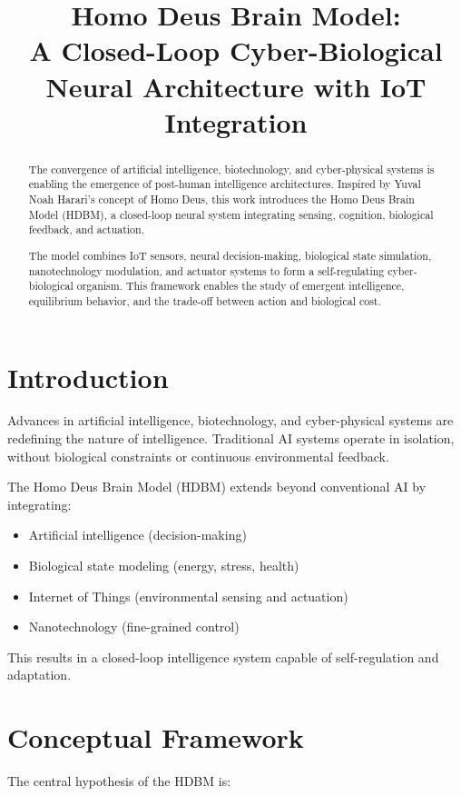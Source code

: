 \documentclass[12pt]{article}
\title{\textbf{Homo Deus Brain Model: \\ A Closed-Loop Cyber-Biological Neural Architecture with IoT Integration}}
\author{}
\date{}
\begin{document}
\maketitle

\begin{abstract}
The convergence of artificial intelligence, biotechnology, and cyber-physical systems is enabling the emergence of post-human intelligence architectures. Inspired by Yuval Noah Harari's concept of Homo Deus, this work introduces the Homo Deus Brain Model (HDBM), a closed-loop neural system integrating sensing, cognition, biological feedback, and actuation.

The model combines IoT sensors, neural decision-making, biological state simulation, nanotechnology modulation, and actuator systems to form a self-regulating cyber-biological organism. This framework enables the study of emergent intelligence, equilibrium behavior, and the trade-off between action and biological cost.
\end{abstract}

\section{Introduction}

Advances in artificial intelligence, biotechnology, and cyber-physical systems are redefining the nature of intelligence. Traditional AI systems operate in isolation, without biological constraints or continuous environmental feedback.

The Homo Deus Brain Model (HDBM) extends beyond conventional AI by integrating:

\begin{itemize}
\item Artificial intelligence (decision-making)
\item Biological state modeling (energy, stress, health)
\item Internet of Things (environmental sensing and actuation)
\item Nanotechnology (fine-grained control)
\end{itemize}

This results in a closed-loop intelligence system capable of self-regulation and adaptation.

\section{Conceptual Framework}

The central hypothesis of the HDBM is:
\end{document}

